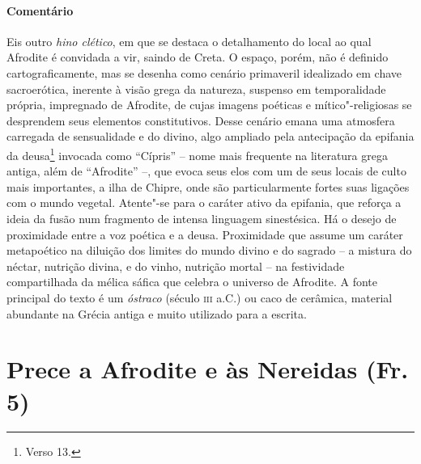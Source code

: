 \pagebreak
{\paragraph{Comentário} Eis outro \textit{hino clético}, em que se destaca o detalhamento do local ao
qual Afrodite é convidada a vir, saindo de Creta. O espaço, porém, não é
definido cartograficamente, mas se desenha como cenário primaveril idealizado
em chave sacroerótica, inerente à visão grega da natureza, suspenso em
temporalidade própria, impregnado de Afrodite, de cujas imagens poéticas e
mítico"-religiosas se desprendem seus elementos constitutivos. Desse cenário
emana uma atmosfera carregada de sensualidade e do divino, algo ampliado pela
antecipação da epifania da deusa\footnote{Verso 13.} invocada como ``Cípris'' --
nome mais frequente na literatura grega antiga, além de ``Afrodite'' --, que evoca
seus elos com um de seus locais de culto mais importantes, a ilha de Chipre,
onde são particularmente fortes suas ligações com o mundo vegetal. Atente"-se
para o caráter ativo da epifania, que reforça a ideia da fusão num fragmento de intensa linguagem sinestésica. Há o desejo de proximidade
entre a voz poética e a deusa. Proximidade que assume um caráter metapoético na diluição dos limites do mundo divino e do sagrado -- a mistura do néctar, nutrição divina, e do vinho, nutrição mortal -- na festividade compartilhada da mélica sáfica que celebra o universo de Afrodite. A fonte principal do texto é um \textit{óstraco} (século \textsc{iii} a.C.) ou caco de cerâmica, material abundante na Grécia antiga e muito utilizado para a
escrita.}


\pagebreak
\section{Prece a Afrodite e às Nereidas (Fr.\,5)}

